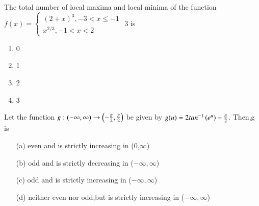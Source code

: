 \documentclass[journal,12pt,twocolumn]{IEEEtran}
\theoremstyle{remark}
\begin{document}
 
    \item 
    The total number of local maxima and local minima of the function \\
   
   $ f(x)=\begin{cases} 
   (2+x)^3, -3<x\le -1\\
   x^{2/3} ,-1<x<2
   \end{cases}$ 3 is
   \hfill{}
    \begin{enumerate}
     \item 0 
     \item 1
     \item 2 
     \item 3 
    \end{enumerate}   


   \item 
   Let the function $g:(-\infty,\infty) \rightarrow  \left(-\frac{\pi}{2},\frac{\pi}{2}\right)$ be given by $g(u)= 2 tan^{-1}\left(e^u\right)-\frac{\pi}{2}$. Then,g is  
   
   \hfill{}
   \begin{enumerate}

   \item[(a)] even and is strictly increasing in (0,$\infty$)
 
   \item[(b)] odd and is strictly decreasing in ($-\infty,\infty$)


   \item[(c)] odd and is strictly increasing in ($-\infty,\infty$)

   \item [(d)]neither even nor odd,but is strictly increasing in ($-\infty,\infty$) \\

   \end{enumerate}    
\end{document}
